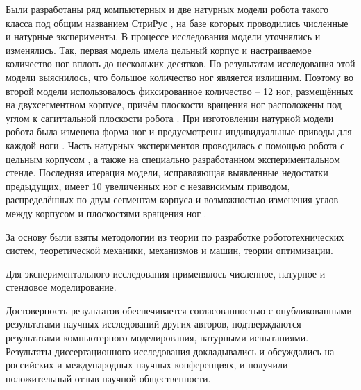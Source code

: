   Были разработаны ряд компьютерных и две натурных модели робота такого класса под общим названием СтриРус , на базе которых проводились численные и натурные эксперименты. В процессе исследования модели уточнялись и изменялись. Так, первая модель  имела цельный корпус и настраиваемое количество ног вплоть до нескольких десятков. По результатам исследования этой модели выяснилось, что большое количество ног является излишним. Поэтому во второй модели использовалось фиксированное количество -- 12 ног, размещённых на двухсегментном корпусе, причём плоскости вращения ног расположены под углом к сагиттальной плоскости робота . При изготовлении натурной модели робота была изменена форма ног и предусмотрены индивидуальные приводы для каждой ноги . Часть натурных экспериментов проводилась с помощью робота с цельным корпусом , а также на специально разработанном экспериментальном стенде. Последняя итерация модели, исправляющая выявленные недостатки предыдущих, имеет 10 увеличенных ног с независимым приводом, распределённых по двум сегментам корпуса и возможностью изменения углов между корпусом и плоскостями вращения ног .

{\methods} За основу были взяты методологии из теории по разработке робототехнических систем, теоретической механики, механизмов и машин, теории оптимизации.

Для экспериментального исследования применялось численное, натурное и стендовое моделирование.

{\reliability} Достоверность результатов обеспечивается согласованностью с опубликованными результатами научных исследований других авторов, подтверждаются результатами компьютерного моделирования, натурными испытаниями. Результаты диссертационного исследования докладывались и обсуждались на российских и международных научных конференциях, и получили положительный отзыв научной общественности.

